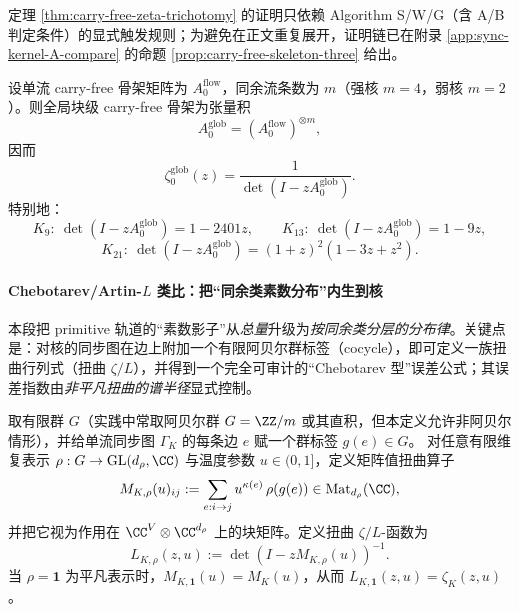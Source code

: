 \begin{remark}[可审计证明位置]
定理 \ref{thm:carry-free-zeta-trichotomy} 的证明只依赖 Algorithm S/W/G（含 A/B 判定条件）的显式触发规则；为避免在正文重复展开，证明链已在附录 \ref{app:sync-kernel-A-compare} 的命题 \ref{prop:carry-free-skeleton-three} 给出。
\end{remark}

\begin{corollary}\label{cor:global-assembly-zeta}
设单流 carry-free 骨架矩阵为 $A_0^{\mathrm{flow}}$，同余流条数为 $m$（强核 $m=4$，弱核 $m=2$）。则全局块级 carry-free 骨架为张量积
\[
A_0^{\mathrm{glob}}=(A_0^{\mathrm{flow}})^{\otimes m},
\]
因而
\[
\zeta^{\mathrm{glob}}_0(z)=\frac{1}{\det(I-zA_0^{\mathrm{glob}})}.
\]
特别地：
\[
K_9:\ \det(I-zA_0^{\mathrm{glob}})=1-2401z,\qquad
K_{13}:\ \det(I-zA_0^{\mathrm{glob}})=1-9z,
\]
\[
K_{21}:\ \det(I-zA_0^{\mathrm{glob}})=(1+z)^2(1-3z+z^2).
\]
\end{corollary}



\paragraph{Chebotarev/Artin-\texorpdfstring{$L$}{L} 类比：把“同余类素数分布”内生到核}
本段把 primitive 轨道的“素数影子”从\emph{总量}升级为\emph{按同余类分层的分布律}。关键点是：对核的同步图在边上附加一个有限阿贝尔群标签（cocycle），即可定义一族扭曲行列式（扭曲 $\zeta/L$），并得到一个完全可审计的“Chebotarev 型”误差公式；其误差指数由\emph{非平凡扭曲的谱半径}显式控制。

\begin{definition}[有限群标签与扭曲矩阵族]\label{def:kernel-group-twist}
取有限群 $G$（实践中常取阿贝尔群 $G=\ZZ/m$ 或其直积，但本定义允许非阿贝尔情形），并给单流同步图 $\Gamma_K$ 的每条边 $e$ 赋一个群标签 $g(e)\in G$。
对任意有限维复表示 $\rho:G\to\mathrm{GL}(d_\rho,\CC)$ 与温度参数 $u\in(0,1]$，定义矩阵值扭曲算子
\[
M_{K,\rho}(u)_{ij}:=\sum_{e:i\to j}u^{\kappa(e)}\,\rho(g(e))\in\mathrm{Mat}_{d_\rho}(\CC),
\]
并把它视为作用在 $\CC^{V}\otimes\CC^{d_\rho}$ 上的块矩阵。定义扭曲 $\zeta/L$-函数为
\[
L_{K,\rho}(z,u):=\det(I-zM_{K,\rho}(u))^{-1}.
\]
当 $\rho=\mathbf{1}$ 为平凡表示时，$M_{K,\mathbf{1}}(u)=M_K(u)$，从而 $L_{K,\mathbf{1}}(z,u)=\zeta_K(z,u)$。
\end{definition}

